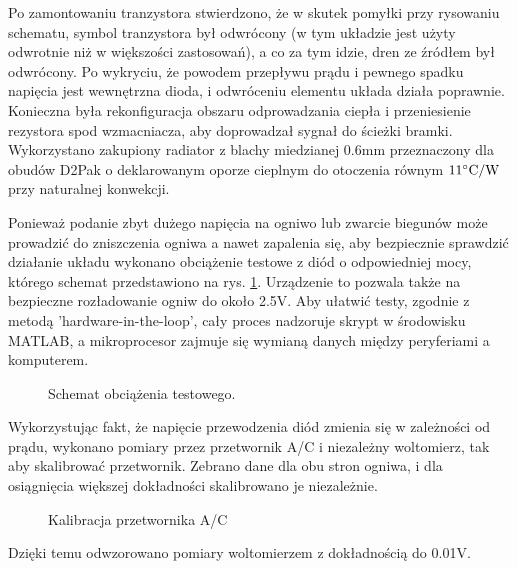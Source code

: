\documentclass[polish,engineer]{polsl-msth}
\begin{document}
Po zamontowaniu tranzystora stwierdzono, że w skutek pomyłki przy rysowaniu schematu, symbol tranzystora był odwrócony (w tym układzie jest użyty odwrotnie niż w większości zastosowań), a co za tym idzie, dren ze źródłem był odwrócony. Po wykryciu, że powodem przepływu prądu i pewnego spadku napięcia jest wewnętrzna dioda, i odwróceniu elementu układa działa poprawnie. Konieczna była rekonfiguracja obszaru odprowadzania ciepła i przeniesienie rezystora spod wzmacniacza, aby doprowadzał sygnał do ścieżki bramki. Wykorzystano zakupiony radiator z blachy miedzianej 0.6mm przeznaczony dla obudów D2Pak o deklarowanym oporze cieplnym do otoczenia równym $\mathrm{11\degree C/W}$ przy naturalnej konwekcji. 

Ponieważ podanie zbyt dużego napięcia na ogniwo lub zwarcie biegunów może prowadzić do zniszczenia ogniwa a nawet zapalenia się, aby bezpiecznie sprawdzić działanie układu wykonano obciążenie testowe z diód o odpowiedniej mocy, którego schemat przedstawiono na rys. \ref{img:testload}. Urządzenie to pozwala także na bezpieczne rozładowanie ogniw do około 2.5V.
Aby ułatwić testy, zgodnie z metodą 'hardware-in-the-loop', cały proces nadzoruje skrypt w środowisku MATLAB, a mikroprocesor zajmuje się wymianą danych między peryferiami a komputerem.
\begin{figure}[hbtp]
    \centering
    \caption{Schemat obciążenia testowego. \label{img:testload}}
\end{figure}

Wykorzystując fakt, że napięcie przewodzenia diód zmienia się w zależności od prądu, wykonano pomiary przez przetwornik A/C i niezależny woltomierz, tak aby skalibrować przetwornik. Zebrano dane dla obu stron ogniwa, i dla osiągnięcia większej dokładności skalibrowano je niezależnie.
\begin{figure}[hbtp]
     \caption{Kalibracja przetwornika A/C \label{img:ADCfitting}}
\end{figure}
Dzięki temu odwzorowano pomiary woltomierzem z dokładnością do 0.01V.
\end{document}
